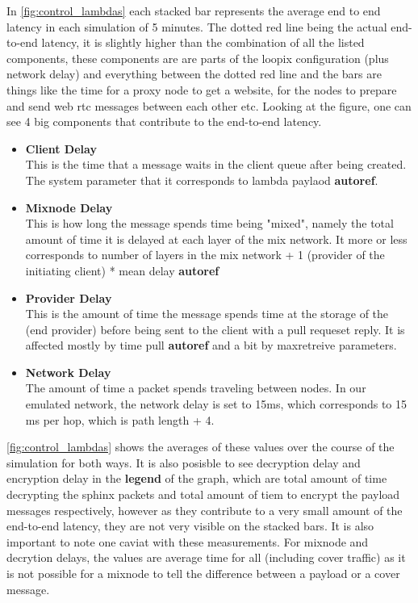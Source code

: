 \documentclass[a4paper,11pt,oneside]{report}
\begin{document}
In \autoref{fig:control_lambdas} each stacked bar represents the average end to end latency in each simulation of 5 minutes. The dotted red line being the actual end-to-end latency, it is slightly higher than the combination of all the listed components, these components are are parts of the loopix configuration (plus network delay) and everything between the dotted red line and the bars are things like the time for a proxy node to get a website, for the nodes to prepare and send web rtc messages between each other etc. Looking at the figure, one can see 4 big components that contribute to the end-to-end latency.

\begin{itemize}
    \item \textbf{Client Delay} \\
    This is the time that a message waits in the client queue after being created. The system parameter that it corresponds  to lambda paylaod \textbf{autoref{}}. 
    \item \textbf{Mixnode Delay} \\
    This is how long the message spends time being "mixed", namely the total amount of time it is delayed at each layer of the mix network. It more or less corresponds to number of layers in the mix network + 1 (provider of the initiating client) * mean delay \textbf{autoref}
    \item \textbf{Provider Delay} \\
    This is the amount of time the message spends time at the storage of the (end provider) before being sent to the client with a pull requeset reply. It is affected mostly by time pull \textbf{autoref} and a bit by maxretreive parameters.
    \item \textbf{Network Delay} \\
    The amount of time a packet spends traveling between nodes. In our emulated network, the network delay is set to 15ms, which corresponds to 15 ms per hop, which is path length + 4. 
\end{itemize}

\autoref{fig:control_lambdas} shows the averages of these values over the course of the simulation for both ways. It is also posisble to see decryption delay and encryption delay in the \textbf{legend} of the graph, which are total amount of time decrypting the sphinx packets and total amount of tiem to encrypt the payload messages respectively, however as they contribute to a very small amount of the end-to-end latency, they are not very visible on the stacked bars. 
It is also important to note one caviat with these measurements. For mixnode and decrytion delays, the values are average time for all (including cover traffic) as it is not possible for a mixnode to tell the difference between a payload or a cover message.
\end{document}
